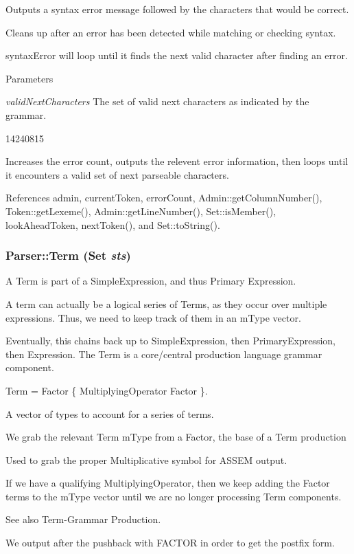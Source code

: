 Outputs a syntax error message followed by the characters that would be correct. 

Cleans up after an error has been detected while matching or checking syntax.

syntaxError will loop until it finds the next valid character after finding an error. 
\begin{DoxyParams}{Parameters}
\item[{\em validNextCharacters}]The set of valid next characters as indicated by the grammar.\end{DoxyParams}
14240815

Increases the error count, outputs the relevent error information, then loops until it encounters a valid set of next parseable characters. 

References admin, currentToken, errorCount, Admin::getColumnNumber(), Token::getLexeme(), Admin::getLineNumber(), Set::isMember(), lookAheadToken, nextToken(), and Set::toString().

\hypertarget{classParser_a55466d8b3d146f56c56e8eb53559e4b1}{
\subsubsection[{Term}]{ Parser::Term ({\bf Set} {\em sts})}}
\label{classParser_a55466d8b3d146f56c56e8eb53559e4b1}


A Term is part of a SimpleExpression, and thus Primary Expression. 

A term can actually be a logical series of Terms, as they occur over multiple expressions. Thus, we need to keep track of them in an mType vector.

Eventually, this chains back up to SimpleExpression, then PrimaryExpression, then Expression. The Term is a core/central production language grammar component.

Term = Factor \{ MultiplyingOperator Factor \}. 

A vector of types to account for a series of terms.

We grab the relevant Term mType from a Factor, the base of a Term production

Used to grab the proper Multiplicative symbol for ASSEM output.

If we have a qualifying MultiplyingOperator, then we keep adding the Factor terms to the mType vector until we are no longer processing Term components. \begin{DoxySeeAlso}{See also}
Term-\/Grammar Production.
\end{DoxySeeAlso}
We output after the pushback with FACTOR in order to get the postfix form. 



